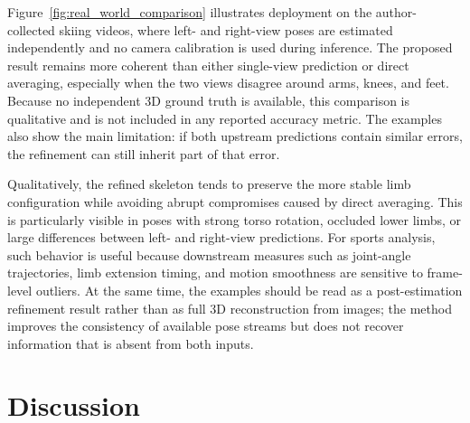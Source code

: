 \documentclass[preprint,12pt]{elsarticle}
\providecommand{\DIFaddbegin}{} %
\providecommand{\DIFaddend}{} %
\begin{document}
Figure~\ref{fig:real_world_comparison} illustrates deployment on the author-collected skiing videos, where left- and right-view poses are estimated independently and no camera calibration is used during inference. The proposed result remains more coherent than either single-view prediction or direct averaging, especially when the two views disagree around arms, knees, and feet. Because no independent 3D ground truth is available, this comparison is qualitative and is not included in any reported accuracy metric. The examples also show the main limitation: if both upstream predictions contain similar errors, the refinement can still inherit part of that error.

Qualitatively, the refined skeleton tends to preserve the more stable limb configuration while avoiding abrupt compromises caused by direct averaging. This is particularly visible in poses with strong torso rotation, occluded lower limbs, or large differences between left- and right-view predictions. For sports analysis, such behavior is useful because downstream measures such as joint-angle trajectories, limb extension timing, and motion smoothness are sensitive to frame-level outliers. At the same time, the examples should be read as a post-estimation refinement result rather than as full 3D reconstruction from images; the method improves the consistency of available pose streams but does not recover information that is absent from both inputs.

\FloatBarrier
\section{Discussion}
\DIFaddbegin \label{sec:discussion}
\DIFaddend 
\end{document}

